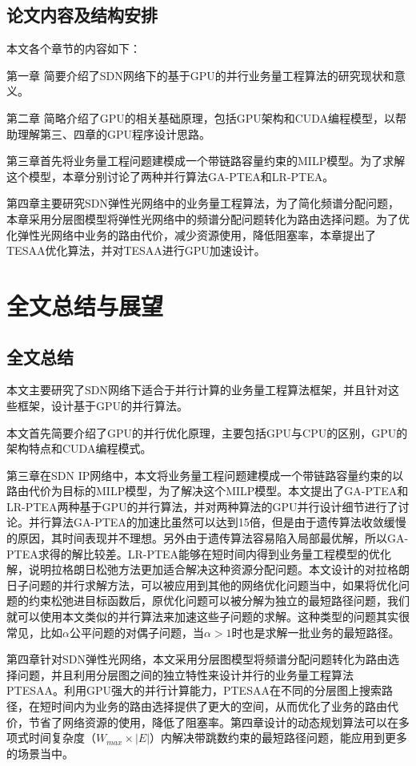 \documentclass[master]{thesis-uestc}
\begin{document}
\section{论文内容及结构安排}
本文各个章节的内容如下：

第一章 简要介绍了SDN网络下的基于GPU的并行业务量工程算法的研究现状和意义。

第二章 简略介绍了GPU的相关基础原理，包括GPU架构和CUDA编程模型，以帮助理解第三、四章的GPU程序设计思路。

第三章首先将业务量工程问题建模成一个带链路容量约束的MILP模型。为了求解这个模型，本章分别讨论了两种并行算法GA-PTEA和LR-PTEA。

第四章主要研究SDN弹性光网络中的业务量工程算法，为了简化频谱分配问题，本章采用分层图模型将弹性光网络中的频谱分配问题转化为路由选择问题。为了优化弹性光网络中业务的路由代价，减少资源使用，降低阻塞率，本章提出了TESAA优化算法，并对TESAA进行GPU加速设计。




\chapter{全文总结与展望}
\section{全文总结}
本文主要研究了SDN网络下适合于并行计算的业务量工程算法框架，并且针对这些框架，设计基于GPU的并行算法。

本文首先简要介绍了GPU的并行优化原理，主要包括GPU与CPU的区别，GPU的架构特点和CUDA编程模式。

第三章在SDN IP网络中，本文将业务量工程问题建模成一个带链路容量约束的以路由代价为目标的MILP模型，为了解决这个MILP模型。本文提出了GA-PTEA和LR-PTEA两种基于GPU的并行算法，并对两种算法的GPU并行设计细节进行了讨论。并行算法GA-PTEA的加速比虽然可以达到15倍，但是由于遗传算法收敛缓慢的原因，其时间表现并不理想。另外由于遗传算法容易陷入局部最优解，所以GA-PTEA求得的解比较差。LR-PTEA能够在短时间内得到业务量工程模型的优化解，说明拉格朗日松弛方法更加适合解决这种资源分配问题。本文设计的对拉格朗日子问题的并行求解方法，可以被应用到其他的网络优化问题当中，如果将优化问题的约束松弛进目标函数后，原优化问题可以被分解为独立的最短路径问题，我们就可以使用本文类似的并行算法来加速这些子问题的求解。这种类型的问题其实很常见，比如$\alpha$公平问题的对偶子问题，当$\alpha>1$时也是求解一批业务的最短路径。

第四章针对SDN弹性光网络，本文采用分层图模型将频谱分配问题转化为路由选择问题，并且利用分层图之间的独立特性来设计并行的业务量工程算法PTESAA。利用GPU强大的并行计算能力，PTESAA在不同的分层图上搜索路径，在短时间内为业务的路由选择提供了更大的空间，从而优化了业务的路由代价，节省了网络资源的使用，降低了阻塞率。第四章设计的动态规划算法可以在多项式时间复杂度（$W_{max}\times|E|$）内解决带跳数约束的最短路径问题，能应用到更多的场景当中。
\end{document}
